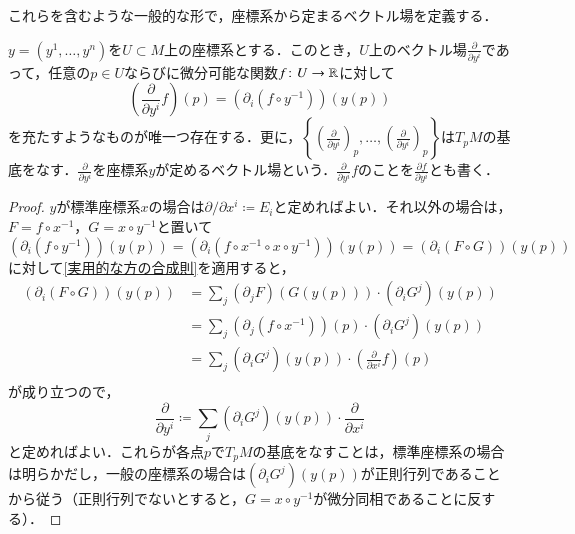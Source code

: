 これらを含むような一般的な形で，座標系から定まるベクトル場を定義する．
\begin{prop}\label{Euclid空間での座標系から定まるベクトル場}
$y=(y^1, \dots, y^n)$を$U \subset M$上の座標系とする．このとき，$U$上のベクトル場$\frac{\partial}{\partial y^i}$であって，任意の$p \in U$ならびに微分可能な関数$f \colon U \to \mathbb{R}$に対して
\begin{equation}
\left( \frac{\partial}{\partial y^i} f \right)(p) = \left(\partial_i (f \circ y^{-1}) \right) (y(p))
\end{equation}を充たすようなものが唯一つ存在する．更に，$\left\{ \left(\frac{\partial}{\partial y^i}\right)_p,\dots, \left(\frac{\partial}{\partial y^i}\right)_p \right\}$は$T_pM$の基底をなす．$\frac{\partial}{\partial y^i}$を座標系$y$が定めるベクトル場という．$\frac{\partial}{\partial y^i} f$のことを$\frac{\partial f}{\partial y^i}$とも書く．
\end{prop}

\begin{proof}
$y$が標準座標系$x$の場合は$\partial / \partial x^i \coloneqq E_i$と定めればよい．それ以外の場合は，$F = f \circ x^{-1}$，$G = x \circ y^{-1}$と置いて$\left(\partial_i (f \circ y^{-1}) \right) (y (p)) = \left(\partial_i (f \circ x^{-1} \circ x \circ y^{-1}) \right) (y (p)) = \left(\partial_i (F \circ G) \right) (y (p))$に対して\cref{実用的な方の合成則}を適用すると，
\begin{align}
\left(\partial_i (F \circ G) \right) (y (p)) &= \sum_{j} (\partial_j F)(G(y(p))) \cdot (\partial_i G^j)(y(p))\\
&= \sum_{j} (\partial_j (f \circ x^{-1}))(p) \cdot (\partial_i G^j)(y(p))\\
&= \sum_{j} (\partial_i G^j)(y(p)) \cdot \left(\frac{\partial}{\partial x^i} f\right)(p)\\
\end{align}が成り立つので，
\begin{equation}
\frac{\partial}{\partial y^i} \coloneqq \sum_{j} (\partial_i G^j)(y(p)) \cdot \frac{\partial}{\partial x^i}
\end{equation}と定めればよい．これらが各点$p$で$T_pM$の基底をなすことは，標準座標系の場合は明らかだし，一般の座標系の場合は$(\partial_i G^j)(y(p))$が正則行列であることから従う（正則行列でないとすると，$G = x \circ y^{-1}$が微分同相であることに反する）．
\end{proof}

